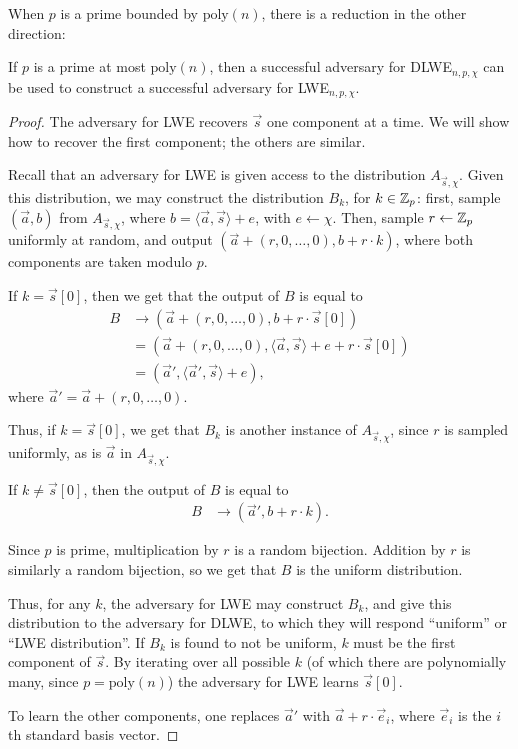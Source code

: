     When $p$ is a prime bounded by $\text{poly}(n)$, there is a reduction in the other direction:

    \begin{lemma}
        If $p$ is a prime at most $\text{poly}(n)$, then a successful adversary for DLWE$_{n, p, \chi}$ can be used to construct a successful adversary for LWE$_{n, p, \chi}$.
    \end{lemma}
    \begin{proof}
        The adversary for LWE recovers $\vec{s}$ one component at a time. We will show how to recover the first component; the others are similar.

        Recall that an adversary for LWE is given access to the distribution $A_{\vec{s}, \chi}$. Given this distribution, we may construct the distribution $B_k$, for $k \in \mathbb{Z}_p$: first, sample $(\vec{a}, b)$ from $A_{\vec{s}, \chi}$, where $b = \langle \vec{a}, \vec{s} \rangle + e$, with $e \leftarrow \chi$. Then, sample $r \leftarrow \mathbb{Z}_p$ uniformly at random, and output $(\vec{a} + (r, 0, \dots, 0), b + r \cdot k)$, where both components are taken modulo $p$.

        If $k = \vec{s}[0]$, then we get that the output of $B$ is equal to
        \begin{align*}
        B &\rightarrow (\vec{a} + (r, 0, \dots, 0), b + r \cdot \vec{s}[0]) \\
        &= (\vec{a} + (r, 0, \dots, 0), \langle \vec{a}, \vec{s} \rangle + e + r \cdot \vec{s}[0]) \\
        &= (\vec{a}', \langle \vec{a}', \vec{s} \rangle + e),
        \end{align*}
        where $\vec{a}' = \vec{a} + (r, 0, \dots, 0)$.

        Thus, if $k = \vec{s}[0]$, we get that $B_k$ is another instance of $A_{\vec{s}, \chi}$, since $r$ is sampled uniformly, as is $\vec{a}$ in $A_{\vec{s}, \chi}$.

        If $k \neq \vec{s}[0]$, then the output of $B$ is equal to
        \begin{align*}
        B &\rightarrow (\vec{a}', b + r \cdot k).
        \end{align*}

        Since $p$ is prime, multiplication by $r$ is a random bijection. Addition by $r$ is similarly a random bijection, so we get that $B$ is the uniform distribution.

        Thus, for any $k$, the adversary for LWE may construct $B_k$, and give this distribution to the adversary for DLWE, to which they will respond ``uniform'' or ``LWE distribution''. If $B_k$ is found to not be uniform, $k$ must be the first component of $\vec{s}$. By iterating over all possible $k$ (of which there are polynomially many, since $p = \text{poly}(n)$) the adversary for LWE learns $\vec{s}[0]$.

        To learn the other components, one replaces $\vec{a}'$ with $\vec{a} + r \cdot \vec{e}_i$, where $\vec{e}_i$ is the $i$th standard basis vector.
    \end{proof}

